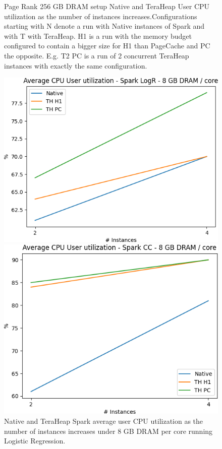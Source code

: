 \begin{figure}[thbp]
    \caption{Page Rank 256 GB DRAM setup Native and TeraHeap
    User CPU utilization as the number of instances increases.Configurations
    starting with N denote a run with Native instances of Spark and
    with T with TeraHeap. H1 is a run with the memory budget
    configured to contain a bigger size for H1 than PageCache and PC
    the opposite. E.g. T2 PC is a run of 2 concurrent TeraHeap
    instances with exactly the same configuration. }
   \label{fig:pr_256_usr}
		\fi
        \centering
   \includegraphics[width=\linewidth]{./fig/LOGR_64_USR.png}
    \caption{Native and TeraHeap Spark average user CPU utilization
        as the number of instances increases under 8 GB DRAM per core running Logistic Regression.}
           \label{fig:logr_64_usr}
	\includegraphics[width=\linewidth]{./fig/CC_64_USR.png}

\end{figure}
